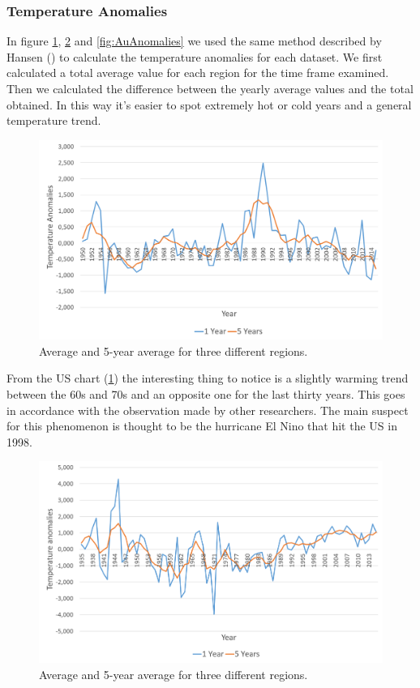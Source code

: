 \documentclass{vldb}
\begin{document}
\subsubsection{Temperature Anomalies}
In figure \ref{fig:UsAnomalies}, \ref{fig:EuAnomalies} and \ref{fig:AuAnomalies} we used the same method described by Hansen (\cite{hansen1999giss}) to calculate the temperature anomalies for each dataset. We first calculated a total average value for each region for the time frame examined. Then we calculated the difference between the yearly average values and the total obtained. In this way it's easier to spot extremely hot or cold years and a general temperature trend. 


\begin{figure}[tbh]
\includegraphics[width=1\linewidth]{UsAnomalies}
\caption{Average and 5-year average for three different regions.}
\label{fig:UsAnomalies}
\end{figure}

From the US chart (\ref{fig:UsAnomalies}) the interesting thing to notice is a slightly warming trend between the 60s and 70s and an opposite one for the last thirty years. This goes in accordance with the observation made by other researchers\cite{hansen2006global}. The main suspect for this phenomenon is thought to be the hurricane El Nino that hit the US in 1998.

\begin{figure}[tbh]
\includegraphics[width=1\linewidth]{EuAnomalies}
\caption{Average and 5-year average for three different regions.}
\label{fig:EuAnomalies}
\end{figure}
\end{document}
